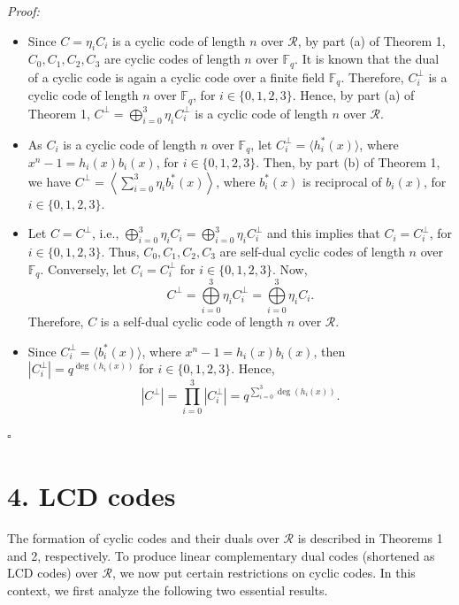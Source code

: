 \documentclass[12pt]{article}
\begin{document}
\noindent\textit{Proof:}
\begin{itemize}
    \item[(a)] Since $C = \eta_i C_i$ is a cyclic code of length $n$ over $\mathcal{R}$, by part (a) of Theorem 1, $C_0, C_1, C_2, C_3$ are cyclic codes of length $n$ over $\mathbb{F}_q$. It is known that the dual of a cyclic code is again a cyclic code over a finite field $\mathbb{F}_q$. Therefore, $C_i^{\perp}$ is a cyclic code of length $n$ over $\mathbb{F}_q$, for $i \in \{0,1,2,3\}$. Hence, by part (a) of Theorem 1, $C^{\perp} = \bigoplus\limits_{i=0}^3 \eta_i C_i^{\perp}$ is a cyclic code of length $n$ over $\mathcal{R}$.
    
    \item[(b)] As $C_i$ is a cyclic code of length $n$ over $\mathbb{F}_q$, let $C_i^{\perp} = \langle h_i^*(x) \rangle$, where $x^n - 1 = h_i(x) b_i(x)$, for $i \in \{0,1,2,3\}$. Then, by part (b) of Theorem 1, we have $C^{\perp} = \left\langle \sum\limits_{i=0}^3 \eta_i b_i^*(x) \right\rangle$, where $b_i^*(x)$ is reciprocal of $b_i(x)$, for $i \in \{0,1,2,3\}$.
    
    \item[(c)] Let $C = C^{\perp}$, i.e., $\bigoplus\limits_{i=0}^3 \eta_i C_i = \bigoplus\limits_{i=0}^3 \eta_i C_i^{\perp}$ and this implies that $C_i = C_i^{\perp}$, for $i \in \{0,1,2,3\}$. Thus, $C_0, C_1, C_2, C_3$ are self-dual cyclic codes of length $n$ over $\mathbb{F}_q$. Conversely, let $C_i = C_i^{\perp}$ for $i \in \{0,1,2,3\}$. Now,
    \[
    C^{\perp} = \bigoplus\limits_{i=0}^3 \eta_i C_i^{\perp} = \bigoplus\limits_{i=0}^3 \eta_i C_i.
    \]
    Therefore, $C$ is a self-dual cyclic code of length $n$ over $\mathcal{R}$.
    
    \item[(d)] Since $C_i^{\perp} = \langle b_i^*(x) \rangle$, where $x^n - 1 = h_i(x) b_i(x)$, then $|C_i^{\perp}| = q^{\deg(h_i(x))}$ for $i \in \{0,1,2,3\}$. Hence,
    \[
    |C^{\perp}| = \prod_{i=0}^3 |C_i^{\perp}| = q^{\sum\limits_{i=0}^3 \deg(h_i(x))}.
    \]
\end{itemize}
$\square$

\section*{4. LCD codes}

The formation of cyclic codes and their duals over $\mathcal{R}$ is described in Theorems 1 and 2, respectively. To produce linear complementary dual codes (shortened as LCD codes) over $\mathcal{R}$, we now put certain restrictions on cyclic codes. In this context, we first analyze the following two essential results.
\end{document}
